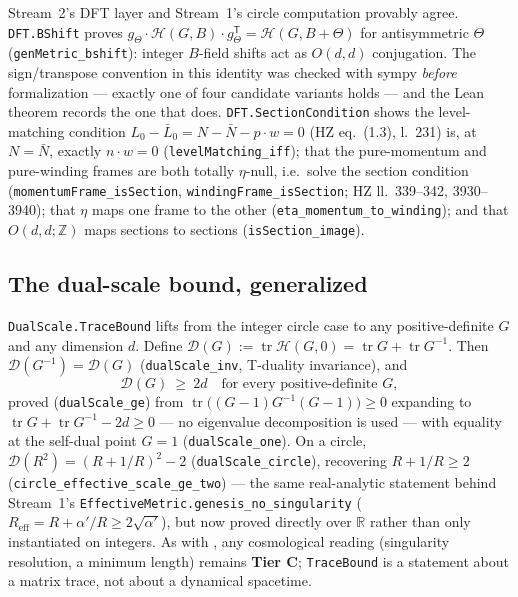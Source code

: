 \documentclass[11pt,a4paper]{article}
\theoremstyle{remark}
\begin{document}
Stream~2's DFT layer and Stream~1's circle computation provably agree. \texttt{DFT.BShift} proves
$g_\Theta\cdot\mathcal H(G,B)\cdot g_\Theta^{\mathsf T}=\mathcal H(G,B+\Theta)$ for antisymmetric
$\Theta$ (\texttt{genMetric\_\discretionary{}{}{}bshift}): integer $B$-field shifts act as $O(d,d)$
conjugation. The sign/transpose convention in this identity was checked with sympy \emph{before}
formalization --- exactly one of four candidate variants holds --- and the Lean theorem records the
one that does. \texttt{DFT.SectionCondition} shows the level-matching condition
$L_0-\bar L_0=N-\bar N-p\cdot w=0$ (HZ eq.~(1.3), l.~231) is, at $N=\bar N$, exactly $n\cdot w=0$
(\texttt{levelMatching\_\discretionary{}{}{}iff}); that the pure-momentum and pure-winding frames are
both totally $\eta$-null, i.e.\ solve the section condition
(\texttt{momentumFrame\_\discretionary{}{}{}isSection}, \texttt{windingFrame\_\discretionary{}{}{}isSection};
HZ ll.~339--342, 3930--3940); that $\eta$ maps one frame to the other
(\texttt{eta\_\discretionary{}{}{}momentum\_\discretionary{}{}{}to\_\discretionary{}{}{}winding}); and
that $O(d,d;\mathbb Z)$ maps sections to sections
(\texttt{isSection\_\discretionary{}{}{}image}).

\subsection{The dual-scale bound, generalized}
\label{sec:stream2-dualscale}
\texttt{DualScale.TraceBound} lifts  from the integer circle case to any
positive-definite $G$ and any dimension $d$. Define $\mathcal D(G):=\operatorname{tr}\mathcal
H(G,0)=\operatorname{tr}G+\operatorname{tr}G^{-1}$. Then $\mathcal D(G^{-1})=\mathcal D(G)$
(\texttt{dualScale\_\discretionary{}{}{}inv}, T-duality invariance), and
\begin{equation}
  \mathcal D(G)\ \ge\ 2d \quad\text{for every positive-definite } G,
\end{equation}
proved (\texttt{dualScale\_\discretionary{}{}{}ge}) from $\operatorname{tr}\big((G-1)G^{-1}(G-1)\big)\ge0$
expanding to $\operatorname{tr}G+\operatorname{tr}G^{-1}-2d\ge0$ --- no eigenvalue decomposition is
used --- with equality at the self-dual point $G=1$
(\texttt{dualScale\_\discretionary{}{}{}one}). On a circle, $\mathcal D(R^2)=(R+1/R)^2-2$
(\texttt{dualScale\_\discretionary{}{}{}circle}), recovering $R+1/R\ge2$
(\texttt{circle\_\discretionary{}{}{}effective\_\discretionary{}{}{}scale\_\discretionary{}{}{}ge\_\discretionary{}{}{}two}) ---
the same real-analytic statement behind Stream~1's
\texttt{EffectiveMetric.\discretionary{}{}{}genesis\_\discretionary{}{}{}no\_\discretionary{}{}{}singularity}
($R_{\mathrm{eff}}=R+\alpha'/R\ge2\sqrt{\alpha'}$), but now proved directly over $\mathbb R$ rather
than only instantiated on integers. As with , any cosmological reading (singularity
resolution, a minimum length) remains \textbf{Tier C}; \texttt{TraceBound} is a statement about a
matrix trace, not about a dynamical spacetime.
\end{document}
